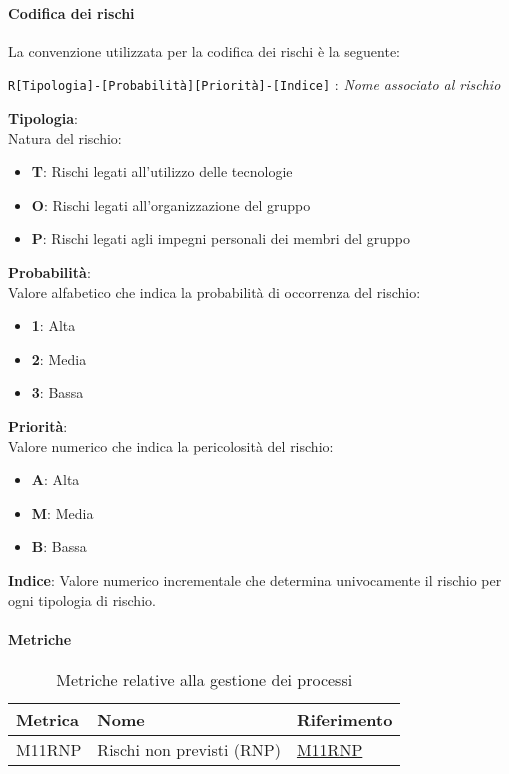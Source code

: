 \paragraph{Codifica dei rischi}
La convenzione utilizzata per la codifica dei rischi è la seguente: 
\begin{center}
    \texttt{R[Tipologia]-[Probabilità][Priorità]-[Indice]} : \textit{Nome associato al rischio}
\end{center} 

\begin{flushleft}
    \textbf{Tipologia}: \\
    Natura del rischio:
    \begin{itemize}
        \item \textbf{T}: Rischi legati all'utilizzo delle tecnologie 
        \item \textbf{O}: Rischi legati all'organizzazione del gruppo 
        \item \textbf{P}: Rischi legati agli impegni personali dei membri del gruppo 
    \end{itemize}
    \textbf{Probabilità}: \\
    Valore alfabetico che indica la probabilità di occorrenza del rischio:
    \begin{itemize}
        \item \textbf{1}: Alta 
        \item \textbf{2}: Media 
        \item \textbf{3}: Bassa 
    \end{itemize}
    \textbf{Priorità}: \\
    Valore numerico che indica la pericolosità del rischio:
    \begin{itemize}
        \item \textbf{A}: Alta
        \item \textbf{M}: Media  
        \item \textbf{B}: Bassa 
    \end{itemize}
    \textbf{Indice}: Valore numerico incrementale che determina univocamente il rischio per ogni tipologia di rischio. 
\end{flushleft}

\paragraph{Metriche}
\begin{table}[H]
  \centering
  \begin{tabular}{|C{3cm}|C{3cm}|C{4cm}|}
  \hline
  Metrica & Nome & Riferimento \\
  \hline \hline
  M11RNP & Rischi non previsti (RNP) &  \hyperlink{item:M11RNP}{M11RNP}\\ 
  \hline
  \end{tabular}
  \caption{Metriche relative alla gestione dei processi}
\end{table}

